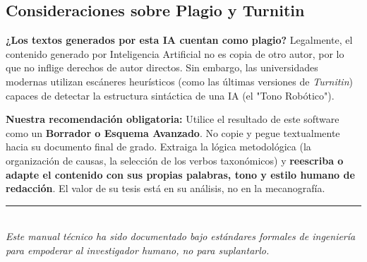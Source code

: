 \documentclass[12pt,a4paper]{article}
\begin{document}
\subsection{Consideraciones sobre Plagio y Turnitin}
\textbf{¿Los textos generados por esta IA cuentan como plagio?}
Legalmente, el contenido generado por Inteligencia Artificial no es copia de otro autor, por lo que no inflige derechos de autor directos. Sin embargo, las universidades modernas utilizan escáneres heurísticos (como las últimas versiones de \textit{Turnitin}) capaces de detectar la estructura sintáctica de una IA (el "Tono Robótico").

\textbf{Nuestra recomendación obligatoria:}
Utilice el resultado de este software como un \textbf{Borrador o Esquema Avanzado}. No copie y pegue textualmente hacia su documento final de grado. Extraiga la lógica metodológica (la organización de causas, la selección de los verbos taxonómicos) y \textbf{reescriba o adapte el contenido con sus propias palabras, tono y estilo humano de redacción}. El valor de su tesis está en su análisis, no en la mecanografía.

\vspace{2cm}
\begin{center}
    \rule{0.5\textwidth}{0.4pt}\\[0.5cm]
    \textit{Este manual técnico ha sido documentado bajo estándares formales de ingeniería para empoderar al investigador humano, no para suplantarlo.}
\end{center}
\end{document}
